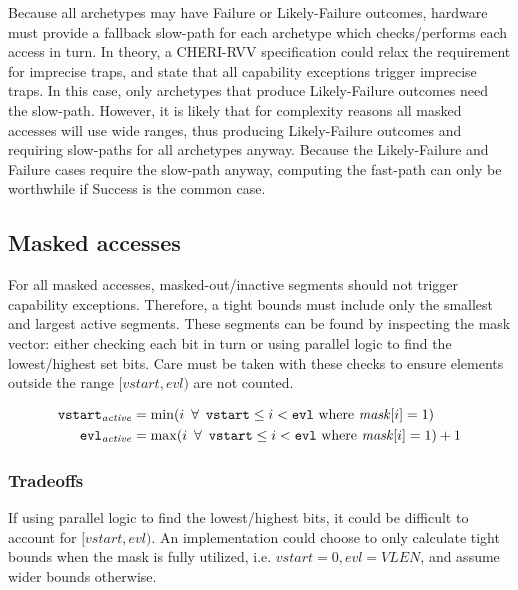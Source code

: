 Because all archetypes may have Failure or Likely-Failure outcomes, hardware must provide a fallback slow-path for each archetype which checks/performs each access in turn.
In theory, a CHERI-RVV specification could relax the  requirement for imprecise traps, and state that all capability exceptions trigger imprecise traps.
In this case, only archetypes that produce Likely-Failure outcomes need the slow-path.
However, it is likely that for complexity reasons all masked accesses will use wide ranges, thus producing Likely-Failure outcomes and requiring slow-paths for all archetypes anyway.
Because the Likely-Failure and Failure cases require the slow-path anyway, computing the fast-path can only be worthwhile if Success is the common case.

\newcommand{\vstart}{\code{vstart}}
\newcommand{\vstartactive}{\code{vstart}_{\mathit{active}}}
\newcommand{\evl}{\code{evl}}
\newcommand{\evlactive}{\code{evl}_{\mathit{active}}}
\newcommand{\baseaddr}{\mathit{base}}

\subsection{Masked accesses}
For all masked accesses, masked-out/inactive segments should not trigger capability exceptions.
Therefore, a tight bounds must include only the smallest and largest active segments.
These segments can be found by inspecting the mask vector: either checking each bit in turn or using parallel logic to find the lowest/highest set bits.
Care must be taken with these checks to ensure elements outside the range $[\textit{vstart}, \textit{evl})$ are not counted.

\begin{align}
    \vstartactive{} &= \min(i\ \forall\ \vstart{} \le i < \evl{}\ \text{where}\ \mathit{mask}[i] = 1) \\
    \evlactive{}    &= \max(i\ \forall\ \vstart{} \le i < \evl{}\ \text{where}\ \mathit{mask}[i] = 1) + 1
\end{align}

\subsubsection*{Tradeoffs}
If using parallel logic to find the lowest/highest bits, it could be difficult to account for $[\textit{vstart}, \textit{evl})$.
An implementation could choose to only calculate tight bounds when the mask is fully utilized, i.e. $\textit{vstart} = 0, \textit{evl} = \textit{VLEN}$, and assume wider bounds otherwise.

